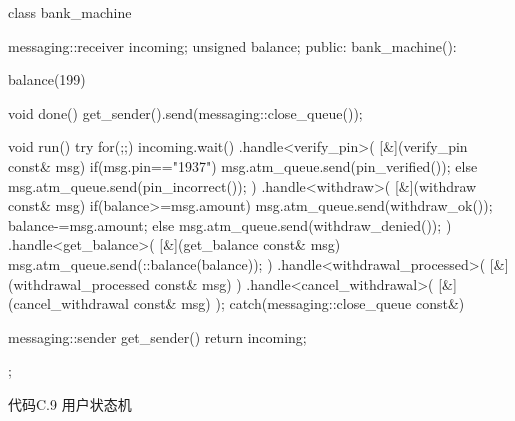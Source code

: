 \begin{cpp}
class bank_machine
{
  messaging::receiver incoming;
  unsigned balance;
public:
  bank_machine():

  balance(199)
  {}

  void done()
  {
    get_sender().send(messaging::close_queue());
  }

  void run()
  {
    try
    {
      for(;;)
      {
        incoming.wait()
          .handle<verify_pin>(
           [&](verify_pin const& msg)
           {
             if(msg.pin=="1937")
             {
               msg.atm_queue.send(pin_verified());
             }
             else
             {
               msg.atm_queue.send(pin_incorrect());
             }
           })
          .handle<withdraw>(
           [&](withdraw const& msg)
           {
             if(balance>=msg.amount)
             {
               msg.atm_queue.send(withdraw_ok());
               balance-=msg.amount;
             }
             else
             {
               msg.atm_queue.send(withdraw_denied());
             }
           })
          .handle<get_balance>(
           [&](get_balance const& msg)
           {
             msg.atm_queue.send(::balance(balance));
           })
          .handle<withdrawal_processed>(
           [&](withdrawal_processed const& msg)
           {
           })
          .handle<cancel_withdrawal>(
           [&](cancel_withdrawal const& msg)
           {
           });
      }
    }
    catch(messaging::close_queue const&)
    {
    }
  }

  messaging::sender get_sender()
  {
  return incoming;
  }
};
\end{cpp}

代码C.9 用户状态机

